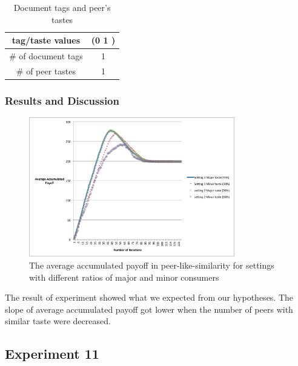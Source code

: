 \documentclass [12pt]{article} \usepackage{multicol}
\begin{document}
\begin{table}[h!]
\caption{Document tags and peer's tastes}

\begin{center}

\begin{tabular}{|c|c|}
\hline tag/taste values & (0 1 )\\
\hline \# of document tags   &  1\\ \hline 
\# of peer tastes  &  1 \\ \hline 
\end{tabular}

\end{center}
\label{default}
\end{table}


\subsubsection{Results and Discussion}



\begin{figure}[h!]
\begin{center}
\includegraphics[width=0.8\textwidth,center]{images/EXP10-peer-sim-twoSettings-MajorMinor}
\caption{The average accumulated payoff in peer-like-similarity for settings with different ratios of major and minor consumers}
\end{center}
\end{figure}


The result of experiment showed what we expected from our hypotheses. The slope of average accumulated payoff got lower when the number of 
peers with similar taste were decreased.  


\subsection{Experiment 11}
\end{document}
